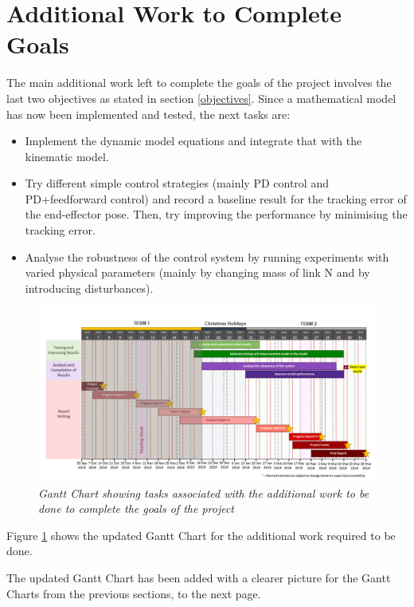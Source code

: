 \documentclass[a4paper,12pt]{report}
\begin{document}
\section{Additional Work to Complete Goals}
The main additional work left to complete the goals of the project involves the last two objectives as stated in section \ref{objectives}. Since a mathematical model has now been implemented and tested, the next tasks are: 
\begin{itemize}
	\item Implement the dynamic model equations and integrate that with the kinematic model.
	\item Try different simple control strategies (mainly PD control and PD+feedforward control) and record a baseline result for the tracking error of the end-effector pose. Then, try improving the performance by minimising the tracking error.
	\item Analyse the robustness of the control system by running experiments with varied physical parameters (mainly by changing mass of link N and by introducing disturbances).
\end{itemize}
\begin{figure}[H]
	\centering
	\includegraphics[width=\textwidth]{images/gc-chap4.png}
	\caption{\textit{Gantt Chart showing tasks associated with the additional work to be done to complete the goals of the project}}
	\label{gc-4}
\end{figure}
Figure \ref{gc-4} shows the updated Gantt Chart for the additional work required to be done. 

The updated Gantt Chart has been added with a clearer picture for the Gantt Charts from the previous sections, to the next page.
\pagebreak
\label{UpdatedGC}



\end{document}
